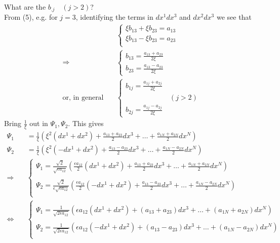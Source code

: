 What are the $b_{.j}\quad (j>2)$?
 \\From (5), e.g. for $j=3$,  identifying the terms in $dx^1dx^3$ and $dx^2dx^3$ we see that
\begin{align*}
&\left \{ \begin{array}{l} 
 \xi b_{13}+\xi b_{23} =a_{13}\\ 
\xi b_{13}-\xi b_{23} =a_{23}\\ 
\end{array}\right.\\
\Rightarrow \quad &\left \{ \begin{array}{l} 
 b_{13}=\frac{a_{13}+a_{23}}{2\xi}\\ 
 b_{23}=\frac{a_{13}-a_{23}}{2\xi}
\end{array}\right.\\
\text{or, in general} \quad &\left \{ \begin{array}{ll} 
 b_{1j}=\frac{a_{1j}+a_{2j}}{2\xi}\\
 \ &\ (j>2)\\ 
 b_{2j}=\frac{a_{1j}-a_{2j}}{2\xi}
\end{array}\right.
\end{align*}
Bring $\frac{1}{\xi}$ out in $\Psi_1, \Psi_2$. This gives
\begin{align*}
\Psi_1 &= \frac{1}{\xi}\left( \xi^2( dx^1+ dx^2) + \frac{a_{13}+a_{23}}{2}dx^3+ \dots +\frac{a_{1N}+a_{2N}}{2}dx^N \right) \\
\Psi_2 &= \frac{1}{\xi}\left( \xi^2(- dx^1+ dx^2) + \frac{a_{13}-a_{23}}{2}dx^3+ \dots +\frac{a_{1N}-a_{2N}}{2}dx^N \right) \\
\Rightarrow \quad &\left \{ \begin{array}{l} 
\Psi_1 = \frac{\sqrt{2}}{\sqrt{\epsilon a_{12}}}\left( \frac{\epsilon a_{12}}{2 } (dx^1+ dx^2) + \frac{a_{13}+a_{23}}{2}dx^3+ \dots +\frac{a_{1N}+a_{2N}}{2}dx^N \right) \\\\
\Psi_2 = \frac{\sqrt{2}}{\epsilon\sqrt{\epsilon a_{12}}}\left( \frac{\epsilon a_{12}}{2 } (-dx^1+ dx^2) + \frac{a_{13}-a_{23}}{2}dx^3+ \dots +\frac{a_{1N}-a_{2N}}{2}dx^N \right) \\
\end{array}\right.\\
\Leftrightarrow \quad &\left \{ \begin{array}{l} \\
\Psi_1 = \frac{1}{\sqrt{2 \epsilon a_{12}}}\left(\epsilon a_{12}(dx^1+ dx^2) + (a_{13}+a_{23})dx^3+ \dots +(a_{1N}+a_{2N})dx^N \right) \\\\
\Psi_2 = \frac{1}{\sqrt{2 \epsilon a_{12}}}\left( \epsilon a_{12}(- dx^1+ dx^2) + (a_{13}-a_{23})dx^3+ \dots +(a_{1N}-a_{2N})dx^N \right) \\
\end{array}\right.
\end{align*}
